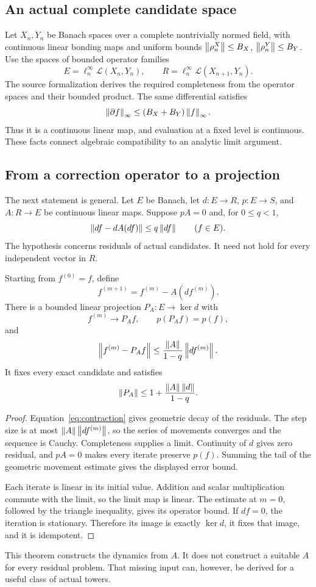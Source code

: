 \label{sec:split}
\subsection{An actual complete candidate space}
Let \(X_n,Y_n\) be Banach spaces over a complete nontrivially normed field, with continuous linear bonding maps and uniform bounds \(\left\lVert\rho^X_n\right\rVert\le B_X\), \(\left\lVert\rho^Y_n\right\rVert\le B_Y\). Use the spaces of bounded operator families
\[
 E=\ell^\infty_n\mathcal L(X_n,Y_n),\qquad
 R=\ell^\infty_n\mathcal L(X_{n+1},Y_n).
\]
The source formalization derives the required completeness from the operator spaces and their bounded product. The same differential satisfies
\[
 \left\lVert\partial f\right\rVert_\infty\le(B_X+B_Y)\left\lVert f\right\rVert_\infty.
\]
Thus it is a continuous linear map, and evaluation at a fixed level is continuous. These facts connect algebraic compatibility to an analytic limit argument.

\subsection{From a correction operator to a projection}
The next statement is general. Let \(E\) be Banach, let \(d:E\to R\), \(p:E\to S\), and \(A:R\to E\) be continuous linear maps. Suppose \(pA=0\) and, for \(0\le q<1\),
\begin{equation}\label{eq:contraction}
 \left\lVert df-dA(df)\right\rVert\le q\left\lVert df\right\rVert\qquad(f\in E).
\end{equation}
The hypothesis concerns residuals of actual candidates. It need not hold for every independent vector in \(R\).

\begin{theorem}\label{KS19}
Starting from \(f^{(0)}=f\), define
\[
 f^{(m+1)}=f^{(m)}-A(df^{(m)}).
\]
There is a bounded linear projection \(P_A:E\to\ker d\) with
\[
 f^{(m)}\longrightarrow P_Af,\qquad p(P_Af)=p(f),
\]
and
\[
 \left\lVert f^{(m)}-P_Af\right\rVert
 \le\frac{\left\lVert A\right\rVert}{1-q}\left\lVert df^{(m)}\right\rVert.
\]
It fixes every exact candidate and satisfies
\[
 \left\lVert P_A\right\rVert\le1+\frac{\left\lVert A\right\rVert\left\lVert d\right\rVert}{1-q}.
\]
\end{theorem}
\begin{proof}
Equation~\eqref{eq:contraction} gives geometric decay of the residuals. The step size is at most \(\left\lVert A\right\rVert\left\lVert df^{(m)}\right\rVert\), so the series of movements converges and the sequence is Cauchy. Completeness supplies a limit. Continuity of \(d\) gives zero residual, and \(pA=0\) makes every iterate preserve \(p(f)\). Summing the tail of the geometric movement estimate gives the displayed error bound.

Each iterate is linear in its initial value. Addition and scalar multiplication commute with the limit, so the limit map is linear. The estimate at \(m=0\), followed by the triangle inequality, gives its operator bound. If \(df=0\), the iteration is stationary. Therefore its image is exactly \(\ker d\), it fixes that image, and it is idempotent.
\end{proof}
This theorem constructs the dynamics from \(A\). It does not construct a suitable \(A\) for every residual problem. That missing input can, however, be derived for a useful class of actual towers.

